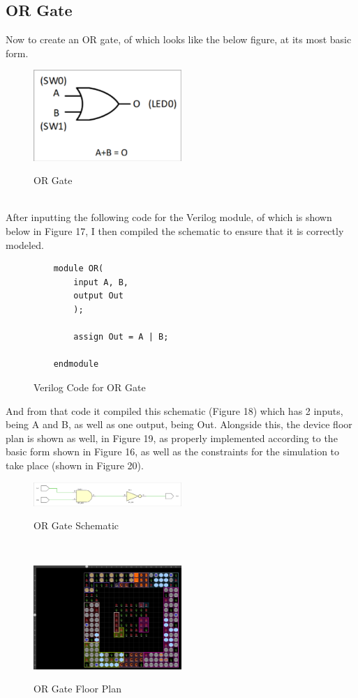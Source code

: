 \documentclass{article}
\begin{document}
\subsection{OR Gate}
Now to create an OR gate, of which looks like the below figure, at its most basic form.\\
\begin{figure}[!htbp]
    \centering
    \caption{OR Gate}
    \includegraphics[width=0.5\textwidth]{OR-GATE.png}
    \label{OR Gate, Simple}
\end{figure}\\
After inputting the following code for the Verilog module, of which is shown below in Figure 17, I then compiled the schematic to ensure that it is correctly modeled.\\
\begin{figure}[!htbp]
    \centering
    \caption{Verilog Code for OR Gate}
    \begin{verbatim}
    module OR(
        input A, B,
        output Out
        );
        
        assign Out = A | B;
        
    endmodule
    \end{verbatim}
\end{figure}
And from that code it compiled this schematic (Figure 18) which has 2 inputs, being A and B, as well as one output, being Out. Alongside this, the device floor plan is shown as well, in Figure 19, as properly implemented according to the basic form shown in Figure 16, as well as the constraints for the simulation to take place (shown in Figure 20).\\
\begin{figure}[!htbp]
    \centering
    \caption{OR Gate Schematic}
    \includegraphics[width=0.5\textwidth]{OR-GATE-SCHEMATIC.png}
    \label{OR Gate, Schematic}
\end{figure}\\
\begin{figure}[!htbp]
    \centering
    \caption{OR Gate Floor Plan}
    \includegraphics[width=0.5\textwidth]{OR-GATE-FLOOR-PLAN.png}
    \label{OR Gate, Floor Plan}
\end{figure}\\
\end{document}
